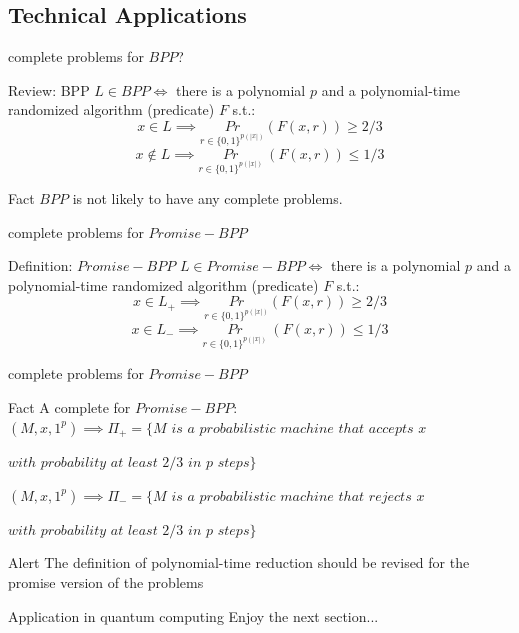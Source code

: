     \subsection{Technical Applications}
        \begin{frame}{complete problems for $BPP$?}
            \begin{block}{Review: BPP}
                $L \in BPP \iff $ there is a polynomial $p$ and a polynomial-time randomized algorithm (predicate) $F$ s.t.:
                $$x \in L \implies \underset{r\in \{0,1\}^{p(|x|)}}{Pr}(F(x,r)) \geq 2/3$$
                $$x \notin L \implies \underset{r\in \{0,1\}^{p(|x|)}}{Pr}\ (F(x,r)) \leq 1/3$$
            \end{block}
            \pause
            \begin{block}{Fact}   
                $BPP$ is not likely to have any complete problems.
            \end{block}
        \end{frame}
        \begin{frame}{complete problems for $Promise-BPP$}
            \begin{block}{Definition: $Promise-BPP$}
                $L \in Promise-BPP \iff $ there is a polynomial $p$ and a polynomial-time randomized algorithm (predicate) $F$ s.t.:
                $$x \in L_+ \implies \underset{r\in \{0,1\}^{p(|x|)}}{Pr}(F(x,r)) \geq 2/3$$
                $$x \in L_- \implies \underset{r\in \{0,1\}^{p(|x|)}}{Pr}\ (F(x,r)) \leq 1/3$$
            \end{block}
            \pause
        \end{frame}
        
        \begin{frame}{complete problems for $Promise-BPP$}
            \begin{block}{Fact}
                A complete for $Promise-BPP$:\\
                $(M,x,1^p) \implies \Pi_+ =\{M$ $is$ $a$ $probabilistic$ $machine$ $that$ $accepts$ $x$
                
                \hfill $with$ $probability$ $at$ $least$ $2/3$ $in$ $p$ $steps\}$

                $(M,x,1^p) \implies \Pi_- =\{M$ $is$ $a$ $probabilistic$ $machine$ $that$ $rejects$ $x$
                
                \hspace{100pt} $with$ $probability$ $at$ $least$ $2/3$ $in$ $p$ $steps\}$
            \end{block}
            \pause
            \begin{alertblock}{Alert}
                The definition of polynomial-time reduction should be revised for the promise version of the problems
            \end{alertblock}
        \end{frame}
        
        \begin{frame}{Application in quantum computing}
            \huge{Enjoy the next section...}
        \end{frame}